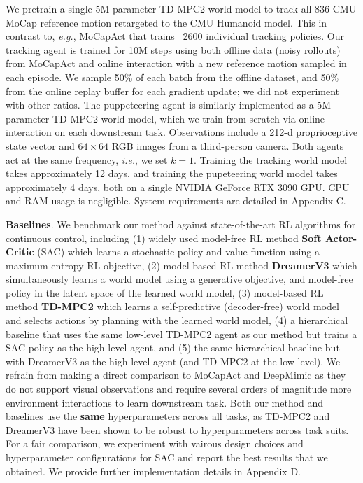 \documentclass[sn-mathphys-num]{sn-jnl}%
\theoremstyle{thmstyleone}	%
\theoremstyle{thmstyletwo}	%
\theoremstyle{thmstylethree}	%
\begin{document}
We pretrain a single 5M parameter TD-MPC2 world model to track all 836 CMU MoCap reference motion retargeted to the CMU Humanoid model.
This in contrast to, \textit{e.g.}, MoCapAct that trains ~2600 individual tracking policies.
Our tracking agent is trained for 10M steps using both offline data (noisy rollouts) from MoCapAct and online interaction with a new reference motion sampled in each episode.
We sample 50\% of each batch from the offline dataset, and 50\% from the online replay buffer for each gradient update;
we did not experiment with other ratios.
The puppeteering agent is similarly implemented as a 5M parameter TD-MPC2 world model, which we train from scratch via online interaction on each downstream task.
Observations include a 212-d proprioceptive state vector and $ 64 \times 64 $ RGB images from a third-person camera.
Both agents act at the same frequency, \textit{i.e.}, we set $ k=1 $.
Training the tracking world model takes approximately 12 days, 
and training the pupeteering world model takes approximately 4 days,
both on a single NVIDIA GeForce RTX 3090 GPU.
CPU and RAM usage is negligible.
System requirements are detailed in Appendix C.


\textbf{Baselines}.
We benchmark our method against state-of-the-art RL algorithms for continuous control, including
(1) widely used model-free RL method \textbf{Soft Actor-Critic} (SAC) which learns a stochastic policy and value function using a maximum entropy RL objective,
(2) model-based RL method \textbf{DreamerV3} which simultaneously learns a world model using a generative objective, and model-free policy in the latent space of the learned world model,
(3) model-based RL method \textbf{TD-MPC2} which learns a self-predictive (decoder-free) world model and selects actions by planning with the learned world model,
(4) a hierarchical baseline that uses the same low-level TD-MPC2 agent as our method but trains a SAC policy as the high-level agent,
and (5) the same hierarchical baseline but with DreamerV3 as the high-level agent (and TD-MPC2 at the low level).
We refrain from making a direct comparison to MoCapAct and DeepMimic as they do not support visual observations and require several orders of magnitude more environment interactions to learn downstream task.
Both our method and baselines use the \textbf{same} hyperparameters across all tasks,
as TD-MPC2 and DreamerV3 have been shown to be robust to hyperparameters across task suits.
For a fair comparison, we experiment with vairous design choices and hyperparameter configurations for SAC and report the best results that we obtained.
We provide further implementation details in Appendix D.
\end{document}
